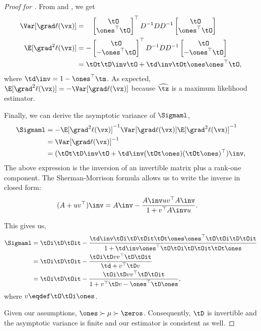 \begin{proof}[Proof for ]
From  and , we get
  \begin{align*}
    \Var [\grad \ell(\vx)] &= \hphantom{-}
        \begin{bmatrix}
          \tO \\
          \ones^\top \tO
        \end{bmatrix}^\top
          D^{-1} D D^{-1} 
        \begin{bmatrix}
          \tO \\
          \ones^\top \tO
        \end{bmatrix} \\
        \E[\grad^2 \ell(\vx)] 
        &= -
        \begin{bmatrix}
          \tO \\
          - \ones^\top \tO
        \end{bmatrix}^\top
          D^{-1} D D^{-1} 
        \begin{bmatrix}
          \tO \\
          - \ones^\top \tO
        \end{bmatrix} \\
   &= \tOt \tD\inv \tO + \td\inv \tOt \ones \ones^\top \tO,
  \end{align*}
where $\td\inv = 1 - \ones^\top \tm$.
As expected, $\E[\grad^2 \ell(\vx)] = -\Var [\grad \ell(\vx)]$ because
$\widehat{\tz}$ is a maximum likelihood estimator. 

Finally, we can derive the asymptotic variance of $\Sigmaml$,
\begin{align*}
    \Sigmaml
      &= -\E[\grad^2 \ell(\vx)]^{-1} \Var [\grad \ell(\vx)] \E[\grad^2 \ell(\vx)]^{-1} \\
      &= \Var[\grad \ell(\vx)]^{-1} \\
      &= (\tOt \tD\inv \tO + \td\inv (\tOt \ones)(\tOt \ones)^\top)\inv,
\end{align*}
The above expression is the inversion of an invertible matrix plus
a rank-one component. The Sherman-Morrison formula allows us to write
the inverse in closed form:
\begin{align*}
  (A + uv^\top)\inv &= A\inv - \frac{A\inv uv^\top A\inv}{1 + v^\top A\inv u}.
\end{align*}

This gives us,
\begin{align}
    \Sigmaml
    &= \tOi \tD \tOit 
      - \frac{\td\inv \tOi \tD \tOit \tOt \ones \ones^\top \tO \tOi \tD \tOit }
      {1 + \td\inv \ones^\top \tO \tOi \tD \tOit \tOt \ones} \nonumber \\
    &= \tOi \tD \tOit 
      - \frac{\tOi \tD v v^\top \tD \tOit }
      {\td + v^\top \tD v} \nonumber \\
    &= \tOi \tD \tOit 
      - \frac{\tOi \tD v v^\top \tD \tOit }
      {1 + v^\top \tD v - \ones^\top \tD \ones}, \label{eqn:asymp-var-ml}
\end{align}
where $v \eqdef \tO \tOi \ones$. 

Given our assumptions, $\ones \succ \mu \succ \zeros$. Consequently,
$\tD$ is invertible and the asymptotic variance is finite and our
estimator is consistent as well. 
\end{proof}

